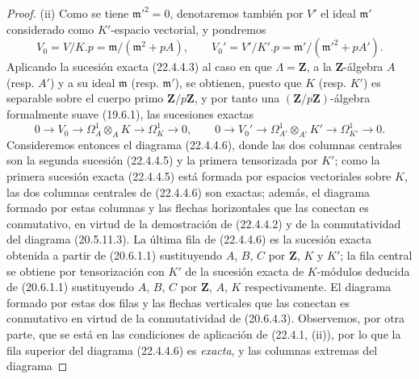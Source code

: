 \begin{proof}
(ii) Como se tiene $\mathfrak m'^2=0$, denotaremos también por $V'$ el ideal
$\mathfrak m'$ considerado como $K'$-espacio vectorial, y pondremos
\begin{equation}
\label{0.22.4.4.4-fr}
  V_0=V/K.p=\mathfrak m/(\mathfrak m^2+pA),\qquad
  V_0'=V'/K'.p=\mathfrak m'/(\mathfrak m'^2+pA').
  \tag{22.4.4.4}
\end{equation}
Aplicando la sucesión exacta (22.4.4.3) al caso en que $\Lambda=\mathbf Z$, a la
$\mathbf Z$-álgebra $A$ (resp. $A'$) y a su ideal $\mathfrak m$
(resp. $\mathfrak m'$), se obtienen, puesto que $K$ (resp. $K'$) es separable sobre
el cuerpo primo $\mathbf Z/p\mathbf Z$, y por tanto una
$(\mathbf Z/p\mathbf Z)$-álgebra formalmente suave (19.6.1), las sucesiones
exactas
\begin{equation}
\label{0.22.4.4.5-fr}
  0\longrightarrow V_0\longrightarrow\Omega^1_A\otimes_AK
  \longrightarrow\Omega^1_K\longrightarrow0,\qquad
  0\longrightarrow V_0'\longrightarrow\Omega^1_{A'}\otimes_{A'}K'
  \longrightarrow\Omega^1_{K'}\longrightarrow0.
  \tag{22.4.4.5}
\end{equation}
Consideremos entonces el diagrama (22.4.4.6), donde las dos columnas centrales son
la segunda sucesión (22.4.4.5) y la primera tensorizada por $K'$; como la
primera sucesión exacta (22.4.4.5) está formada por espacios vectoriales sobre $K$,
las dos columnas centrales de (22.4.4.6) son exactas; además, el
diagrama formado por estas columnas y las flechas horizontales que las
conectan es conmutativo, en virtud de la demostración de (22.4.4.2) y de
la conmutatividad del diagrama (20.5.11.3). La última fila de (22.4.4.6)
es la sucesión exacta obtenida a partir de (20.6.1.1) sustituyendo $A$, $B$,
$C$ por $\mathbf Z$, $K$ y $K'$; la fila central se obtiene por
tensorización con $K'$ de la sucesión exacta de $K$-módulos deducida de
(20.6.1.1) sustituyendo $A$, $B$, $C$ por $\mathbf Z$, $A$, $K$
respectivamente. El diagrama formado por estas dos filas y las flechas
verticales que las conectan es conmutativo en virtud de la conmutatividad de
(20.6.4.3). Observemos, por otra parte, que se está en las condiciones de aplicación
de (22.4.1, (ii)), por lo que la fila superior del diagrama (22.4.4.6) es
\emph{exacta}, y las columnas extremas del diagrama



\end{proof}
